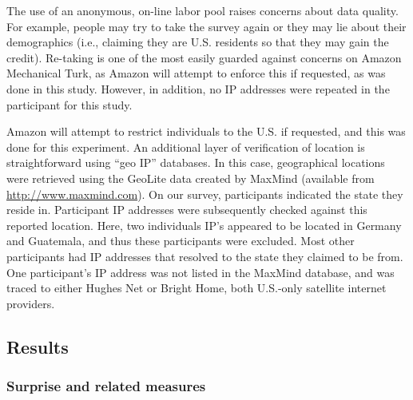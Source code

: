 The use of an anonymous, on-line labor pool raises concerns about data quality.
For example, people may try to take the survey again or they may lie about their
demographics (i.e., claiming they are U.S. residents so that they may gain the
credit). Re-taking is one of the most easily guarded against concerns on Amazon
Mechanical Turk, as Amazon will attempt to enforce this if requested, as was
done in this study. However, in addition, no IP addresses were repeated in the
participant for this study.

Amazon will attempt to restrict individuals to the U.S. if requested, and this
was done for this experiment. An additional layer of verification of location is
straightforward using “geo IP” databases. In this case, geographical locations
were retrieved using the GeoLite data created by MaxMind (available from
\url{http://www.maxmind.com}). On our survey, participants indicated the state
they reside in. Participant IP addresses were subsequently checked against this
reported location. Here, two individuals IP’s appeared to be located in Germany
and Guatemala, and thus these participants were excluded. Most other
participants had IP addresses that resolved to the state they claimed to be
from. One participant’s IP address was not listed in the MaxMind database, and
was traced to either Hughes Net or Bright Home, both U.S.-only satellite
internet providers.

\subsection{Results}

\subsubsection{Surprise and related measures}

